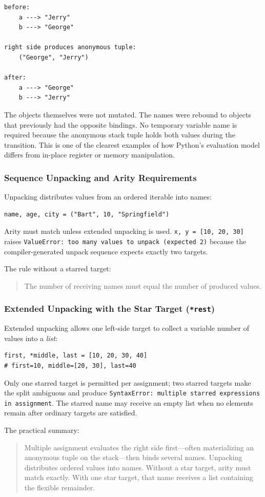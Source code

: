 \begin{verbatim}
before:
    a ---> "Jerry"
    b ---> "George"

right side produces anonymous tuple:
    ("George", "Jerry")

after:
    a ---> "George"
    b ---> "Jerry"
\end{verbatim}

The objects themselves were not mutated. The names were rebound to objects that previously had the opposite bindings. No temporary variable name is required because the anonymous stack tuple holds both values during the transition. This is one of the clearest examples of how Python's evaluation model differs from in-place register or memory manipulation.

\subsubsection{Sequence Unpacking and Arity Requirements}

Unpacking distributes values from an ordered iterable into names:

\begin{verbatim}
name, age, city = ("Bart", 10, "Springfield")
\end{verbatim}

Arity must match unless extended unpacking is used. \texttt{x, y = [10, 20, 30]} raises \texttt{ValueError: too many values to unpack (expected 2)} because the compiler-generated unpack sequence expects exactly two targets.

The rule without a starred target:

\begin{quote}
The number of receiving names must equal the number of produced values.
\end{quote}

\subsubsection{Extended Unpacking with the Star Target (\texttt{*rest})}

Extended unpacking allows one left-side target to collect a variable number of values into a \emph{list}:

\begin{verbatim}
first, *middle, last = [10, 20, 30, 40]
# first=10, middle=[20, 30], last=40
\end{verbatim}

Only one starred target is permitted per assignment; two starred targets make the split ambiguous and produce \texttt{SyntaxError: multiple starred expressions in assignment}. The starred name may receive an empty list when no elements remain after ordinary targets are satisfied.

The practical summary:

\begin{quote}
Multiple assignment evaluates the right side first---often materializing an anonymous tuple on the stack---then binds several names. Unpacking distributes ordered values into names. Without a star target, arity must match exactly. With one star target, that name receives a list containing the flexible remainder.
\end{quote}
